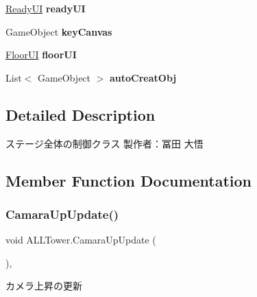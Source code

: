 \begin{DoxyCompactItemize}
\hyperlink{class_ready_u_i}{Ready\+UI} {\bfseries ready\+UI}
\item 
\mbox{\label{class_a_l_l_tower_aeca6635cb241afd8088aa425b38493d1}} 
Game\+Object {\bfseries key\+Canvas}
\item 
\mbox{\label{class_a_l_l_tower_a48dfb4be4de35cff263c87575dfd93b6}} 
\hyperlink{class_floor_u_i}{Floor\+UI} {\bfseries floor\+UI}
\item 
\mbox{\label{class_a_l_l_tower_a8cbd09462a2f718d92ffa798c971f767}} 
List$<$ Game\+Object $>$ {\bfseries auto\+Creat\+Obj}
\end{DoxyCompactItemize}


\subsection{Detailed Description}
ステージ全体の制御クラス 製作者：冨田 大悟 



\subsection{Member Function Documentation}
\mbox{\label{class_a_l_l_tower_aef377489de75ef1b4954862980c8fba5}} 
\subsubsection{\texorpdfstring{Camara\+Up\+Update()}{CamaraUpUpdate()}}
{\footnotesize\ttfamily void A\+L\+L\+Tower.\+Camara\+Up\+Update (\begin{DoxyParamCaption}{ }\end{DoxyParamCaption})\hspace{0.3cm}{\ttfamily [inline]}, {\ttfamily [private]}}



カメラ上昇の更新 

\mbox{\label{class_a_l_l_tower_a26c3821f8496577c36b16c0176fd79b6}} 
